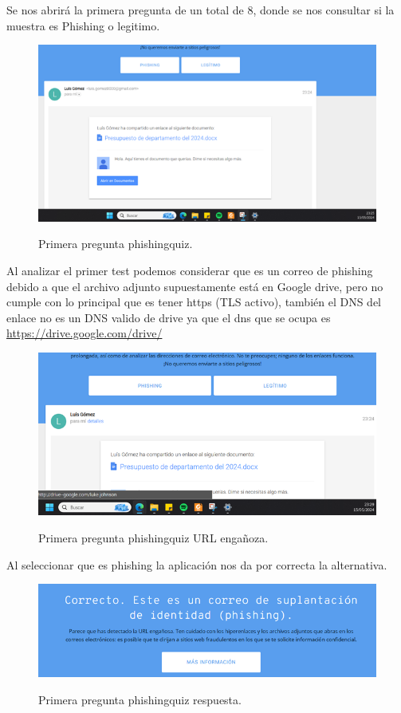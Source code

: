 \documentclass[stu, 11pt, letterpaper, donotrepeattitle, floatsintext, natbib]{apa7}
\begin{document}
Se nos abrirá la primera pregunta de un total de 8, donde se nos consultar si la muestra es Phishing o legitimo.

\begin{figure}[H]
    \centering
    \caption{Primera pregunta phishingquiz.}
    \includegraphics[width=0.75\linewidth]{phishing2.png} %
    \label{fig:OverallEffect}
\end{figure}

Al analizar el primer test podemos considerar que es un correo de phishing debido a que el archivo adjunto supuestamente está en Google drive, pero no cumple con lo principal que es tener https (TLS activo), también el DNS del enlace no es un DNS valido de drive ya que el dns que se ocupa es \url{https://drive.google.com/drive/}

\begin{figure}[H]
    \centering
    \caption{Primera pregunta phishingquiz URL engañoza.}
    \includegraphics[width=0.75\linewidth]{phishing3.png} %
    \label{fig:OverallEffect}
\end{figure}

Al seleccionar que es phishing la aplicación nos da por correcta la alternativa.

\begin{figure}[H]
    \centering
    \caption{Primera pregunta phishingquiz respuesta.}
    \includegraphics[width=0.75\linewidth]{phishing4.png} %
    \label{fig:OverallEffect}
\end{figure}
\end{document}
